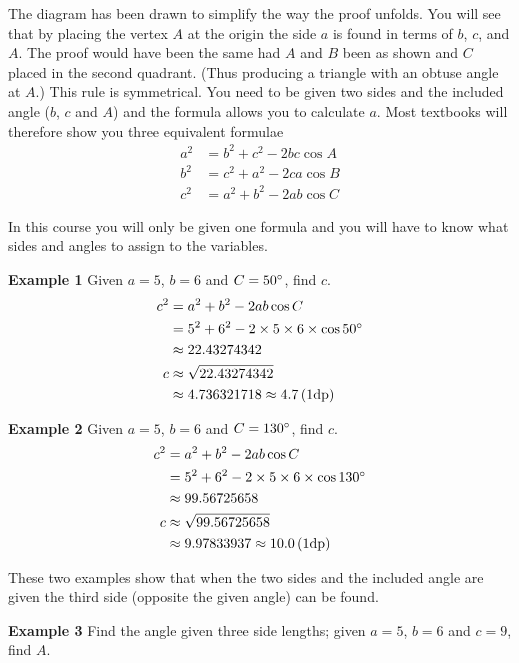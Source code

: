 The diagram has been drawn to simplify the way the proof unfolds. You will see that by placing the vertex $A$ at the origin the side $a$ is found in terms of $b$, $c$, and $A$. The proof would have been the same had $A$ and $B$ been as shown and $C$ placed in the second quadrant. (Thus producing a triangle with an obtuse angle at $A$.) This rule is symmetrical. You need to be given two sides and the included angle ($b$, $c$ and $A$) and the formula allows you to calculate $a$. Most textbooks will therefore show you three equivalent formulae
\begin{align*}a^{2} &  = b^{2} +c^{2} -2 b c \cos  A \\
b^{2} &  = c^{2} +a^{2} -2 c a \cos  B \\
c^{2} &  = a^{2} +b^{2} -2 a b \cos  C\end{align*}

In this course you will only be given one formula and you will have to know what sides and angles to assign to the variables. 

\textbf{Example 1}
Given $a =5$, $b =6$ and $C =50 \mbox{{\ensuremath{{}^\circ}}}$, find $c$.
\begin{align*}c^{2} &  = a^{2} +b^{2} -2 a b \cos  C \\
&  = 5^{2} +6^{2} -2 \times 5 \times 6 \times \cos  50 \mbox{{\ensuremath{{}^\circ}}} \\
&  \approx   22.43274342 \\
c &  \approx   \sqrt{22.43274342} \\
&  \approx   4.736321718 \approx 4.7 \left (1\text{dp}\right )\end{align*}

\textbf{Example 2}
Given $a =5$, $b =6$ and $C =130 \mbox{{\ensuremath{{}^\circ}}}$, find $c$.
\begin{align*}c^{2} &  = a^{2} +b^{2} -2 a b \cos  C \\
&  = 5^{2} +6^{2} -2 \times 5 \times 6 \times \cos  130 \mbox{{\ensuremath{{}^\circ}}} \\
&  \approx   99.56725658 \\
c &  \approx   \sqrt{99.56725658} \\
&  \approx   9.97833937 \approx 10.0 \left (1\text{dp}\right )\end{align*}

These two examples show that when the two sides and the included angle are given the third side
(opposite the given angle) can be found. 

\textbf{Example 3} Find the angle given three side lengths; given $a =5$, $b =6$ and $c =9$, find $A$. 

